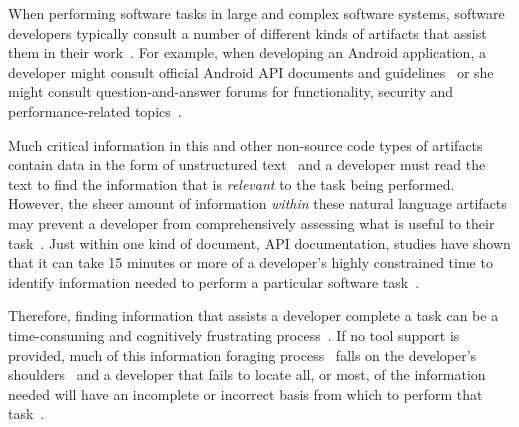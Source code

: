 

When performing software tasks in large and complex software systems, software developers typically consult a number of different kinds of artifacts that assist them in their work~\red{\cite{}}. For example, 
when developing an Android application, a developer might consult official Android API documents and guidelines~\red{\cite{}} or she might consult question-and-answer forums for functionality, security and performance-related topics~\cite{parnin2012}.




Much critical information in this and other non-source code types of artifacts 
contain data in the form of unstructured text~\cite{Bavota2016} and 
a developer must read the text to find the information that is \textit{relevant} to the task being performed.
However, the sheer amount of information \textit{within} these natural language artifacts may prevent a developer from comprehensively assessing what is useful to their task~\cite{Murphy2005}.  Just within one kind of document, API
documentation, studies have shown that it can take 15 minutes or more
of a developer's highly constrained time to identify 
information needed to perform a particular software task~\cite{endrikat2014, Meyer2017}.


Therefore, finding information that assists a developer complete a task can be a time-consuming
and cognitively frustrating process~\cite{Begel2008,
robillard2011field}.
If no tool support is provided, much of this information foraging process~\red{\cite{}} falls on the developer's shoulders~\red{\cite{}} and a developer that fails to locate all, or most, of the information needed
 will have an incomplete or incorrect basis from which to perform that task~\red{\cite{}}.









